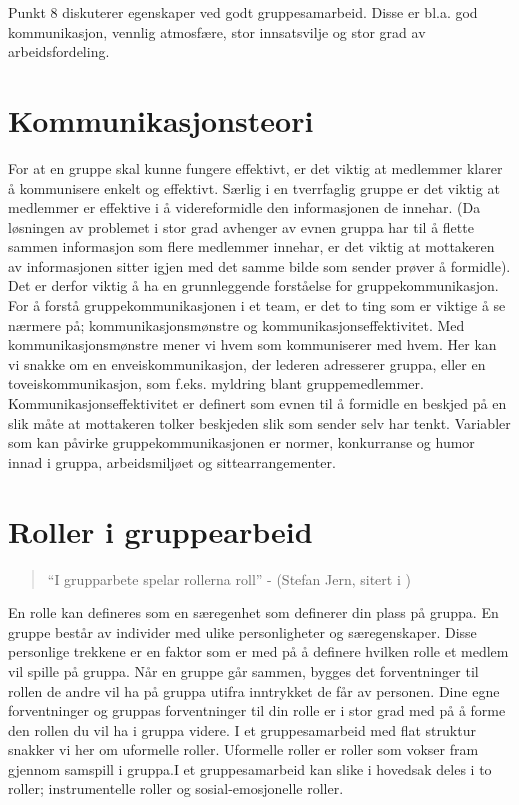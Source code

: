 Punkt 8 diskuterer egenskaper ved godt gruppesamarbeid. Disse er bl.a. god kommunikasjon, vennlig atmosfære, stor innsatsvilje og stor grad av arbeidsfordeling.\\

\section{Kommunikasjonsteori}
\label{sec:kommunikasjonsteori}

%

For at en gruppe skal kunne fungere effektivt, er det viktig at medlemmer klarer
å kommunisere enkelt og effektivt. Særlig i en tverrfaglig gruppe er det viktig
at medlemmer er effektive i å videreformidle den informasjonen de innehar. (Da
løsningen av problemet i stor grad avhenger av evnen gruppa har til å flette
sammen informasjon som flere medlemmer innehar, er det viktig at mottakeren av
informasjonen sitter igjen med det samme bilde som sender prøver å formidle).
Det er derfor viktig å ha en grunnleggende forståelse for
gruppekommunikasjon.\\

For å forstå gruppekommunikasjonen i et team, er det to ting som er viktige å se
nærmere på; kommunikasjonsmønstre og kommunikasjonseffektivitet. Med
kommunikasjonsmønstre mener vi hvem som
kommuniserer med hvem. Her kan vi snakke om en enveiskommunikasjon, der lederen
adresserer gruppa, eller en toveiskommunikasjon, som f.eks. myldring blant
gruppemedlemmer. Kommunikasjonseffektivitet er definert som evnen til å
formidle en beskjed på en slik måte at mottakeren tolker beskjeden slik som
sender selv har tenkt.
Variabler som kan påvirke gruppekommunikasjonen er normer,
konkurranse og humor innad i gruppa, arbeidsmiljøet og sittearrangementer.\\


\section{Roller i gruppearbeid}\label{avs:roller}
\begin{quote}
  ``I grupparbete spelar rollerna roll'' - (Stefan Jern, sitert i \cite{svenskeboka})
\end{quote}

En rolle kan defineres som en særegenhet som definerer din plass
på gruppa. En gruppe består av individer med ulike personligheter og
særegenskaper.  Disse personlige trekkene er en faktor som er med på å definere
hvilken rolle et medlem vil spille på gruppa. Når en gruppe går sammen, bygges
det forventninger til rollen de andre vil ha på gruppa utifra inntrykket de får
av personen. Dine egne forventninger og gruppas forventninger til din rolle er
i stor grad med på å forme den rollen du vil ha i gruppa videre. I et
gruppesamarbeid med flat struktur snakker vi her om uformelle roller. Uformelle
roller er roller som vokser fram gjennom samspill i gruppa.I et gruppesamarbeid
kan slike i hovedsak deles i to roller; instrumentelle roller og
sosial-emosjonelle roller. \\

